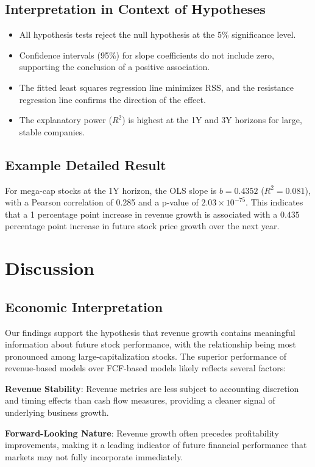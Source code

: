 \documentclass[11pt]{article}
\begin{document}
\subsection{Interpretation in Context of Hypotheses}
\begin{itemize}
    \item All hypothesis tests reject the null hypothesis at the 5\% significance level.
    \item Confidence intervals (95\%) for slope coefficients do not include zero, supporting the conclusion of a positive association.
    \item The fitted least squares regression line minimizes RSS, and the resistance regression line confirms the direction of the effect.
    \item The explanatory power ($R^2$) is highest at the 1Y and 3Y horizons for large, stable companies.
\end{itemize}

\subsection{Example Detailed Result}
For mega-cap stocks at the 1Y horizon, the OLS slope is $b = 0.4352$ ($R^2 = 0.081$), with a Pearson correlation of 0.285 and a p-value of $2.03\times 10^{-75}$. This indicates that a 1 percentage point increase in revenue growth is associated with a $0.435$ percentage point increase in future stock price growth over the next year.

\section{Discussion}

\subsection{Economic Interpretation}

Our findings support the hypothesis that revenue growth contains meaningful information about future stock performance, with the relationship being most pronounced among large-capitalization stocks. The superior performance of revenue-based models over FCF-based models likely reflects several factors:

\textbf{Revenue Stability}: Revenue metrics are less subject to accounting discretion and timing effects than cash flow measures, providing a cleaner signal of underlying business growth.

\textbf{Forward-Looking Nature}: Revenue growth often precedes profitability improvements, making it a leading indicator of future financial performance that markets may not fully incorporate immediately.
\end{document}

